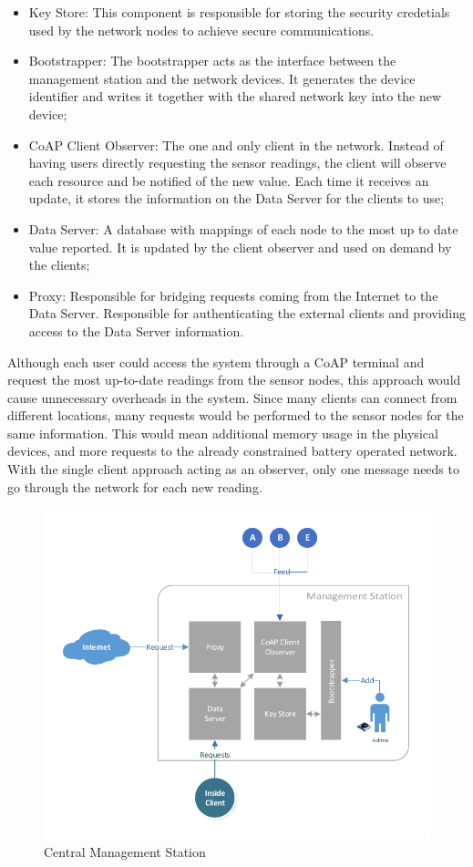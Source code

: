 \documentclass{llncs}
\begin{document}
\begin{itemize}
	\item Key Store: This component is responsible for storing the security credetials used by the network nodes to achieve secure communications.
	\item Bootstrapper: The bootstrapper acts as the interface between the management station and the network devices. 
	It generates the device identifier and writes it together with the shared network key into the new device;
	\item CoAP Client Observer:  The one and only client in the network. 
	Instead of having users directly requesting the sensor readings, the client will observe each resource and be notified of the new value. 
	Each time it receives an update, it stores the information on the Data Server for the clients to use;
	\item Data Server: A database with mappings of each node to the most up to date value reported. 
	It is updated by the client observer and used on demand by the clients;
	\item Proxy: Responsible for bridging requests coming from the Internet to the Data Server. 
	Responsible for authenticating the external clients and providing access to the Data Server information.
\end{itemize}

Although each user could access the system through a \ac{CoAP} terminal and request the most up-to-date readings from the sensor nodes, this approach would cause unnecessary overheads in the system. 
Since many clients can connect from different locations, many requests would be performed to the sensor nodes for the same information. This would mean additional memory usage in the physical devices, and more requests to the already constrained battery operated network. 
With the single client approach acting as an observer, only one message needs to go through the network for each new reading.

\begin{figure}[h]
  \centering
  \includegraphics[width=1.05\linewidth]{figures/White_Box_Model.pdf}
  \caption{Central Management Station}
  \label{fig:core_components}
\end{figure}
\end{document}
